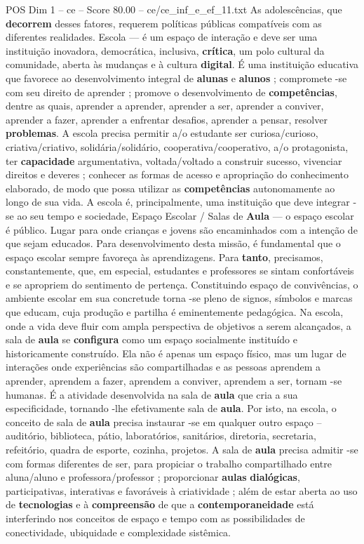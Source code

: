 \begin{textsample}{POS Dim 1 – ce – Score 80.00 – ce/ce\_inf\_e\_ef\_11.txt}
As adolescências, que \textbf{decorrem} desses fatores, requerem políticas públicas compatíveis com as diferentes realidades.
Escola — é um espaço de interação e deve ser uma instituição inovadora, democrática, inclusiva, \textbf{crítica}, um polo cultural da comunidade, aberta às mudanças e à cultura \textbf{digital}.
É uma instituição educativa que favorece ao desenvolvimento integral de \textbf{alunas} e \textbf{alunos} ; compromete -se com seu direito de aprender ; promove o desenvolvimento de \textbf{competências}, dentre as quais, aprender a aprender, aprender a ser, aprender a conviver, aprender a fazer, aprender a enfrentar desafios, aprender a pensar, resolver \textbf{problemas}.
A escola precisa permitir a/o estudante ser curiosa/curioso, criativa/criativo, solidária/solidário, cooperativa/cooperativo, a/o protagonista, ter \textbf{capacidade} argumentativa, voltada/voltado a construir sucesso, vivenciar direitos e deveres ; conhecer as formas de acesso e apropriação do conhecimento elaborado, de modo que possa utilizar as \textbf{competências} autonomamente ao longo de sua vida.
A escola é, principalmente, uma instituição que deve integrar -se ao seu tempo e sociedade, Espaço Escolar / Salas de \textbf{Aula} — o espaço escolar é público.
Lugar para onde crianças e jovens são encaminhados com a intenção de que sejam educados.
Para desenvolvimento desta missão, é fundamental que o espaço escolar sempre favoreça às aprendizagens.
Para \textbf{tanto}, precisamos, constantemente, que, em especial, estudantes e professores se sintam confortáveis e se apropriem do sentimento de pertença.
Constituindo espaço de convivências, o ambiente escolar em sua concretude torna -se pleno de signos, símbolos e marcas que educam, cuja produção e partilha é eminentemente pedagógica.
Na escola, onde a vida deve fluir com ampla perspectiva de objetivos a serem alcançados, a sala de \textbf{aula} se \textbf{configura} como um espaço socialmente instituído e historicamente construído.
Ela não é apenas um espaço físico, mas um lugar de interações onde experiências são compartilhadas e as pessoas aprendem a aprender, aprendem a fazer, aprendem a conviver, aprendem a ser, tornam -se humanas.
É a atividade desenvolvida na sala de \textbf{aula} que cria a sua especificidade, tornando -lhe efetivamente sala de \textbf{aula}.
Por isto, na escola, o conceito de sala de \textbf{aula} precisa instaurar -se em qualquer outro espaço – auditório, biblioteca, pátio, laboratórios, sanitários, diretoria, secretaria, refeitório, quadra de esporte, cozinha, projetos.
A sala de \textbf{aula} precisa admitir -se com formas diferentes de ser, para propiciar o trabalho compartilhado entre aluna/aluno e professora/professor ; proporcionar \textbf{aulas} \textbf{dialógicas}, participativas, interativas e favoráveis à criatividade ; além de estar aberta ao uso de \textbf{tecnologias} e à \textbf{compreensão} de que a \textbf{contemporaneidade} está interferindo nos conceitos de espaço e tempo com as possibilidades de conectividade, ubiquidade e complexidade sistêmica.

\end{textsample}
